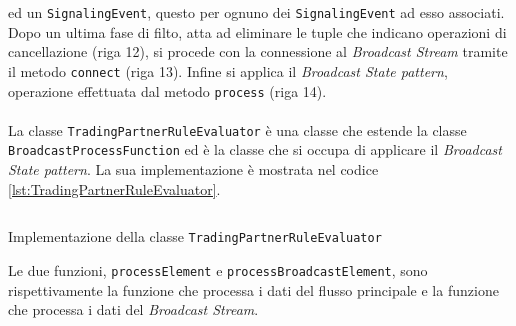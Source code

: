 ed un \texttt{SignalingEvent}, questo per ognuno dei \texttt{SignalingEvent} ad esso associati.
Dopo un ultima fase di filto, atta ad eliminare le tuple che indicano operazioni di cancellazione (riga 12), si procede con la connessione al \textit{Broadcast Stream}
tramite il metodo \texttt{connect} (riga 13).
Infine si applica il \textit{Broadcast State pattern}, operazione effettuata dal metodo \texttt{process} (riga 14).\\\\
La classe \texttt{TradingPartnerRuleEvaluator} è una classe che estende la classe \texttt{BroadcastProcessFunction} ed è la classe che si occupa di applicare il \textit{Broadcast State pattern}.
La sua implementazione è mostrata nel codice \ref{lst:TradingPartnerRuleEvaluator}.
\begin{code}
    \inputminted[linenos,fontsize=\footnotesize]{java}{listings/EventsExport/TradingPartnerRuleEvaluator.java}
    \caption{Implementazione della classe \texttt{TradingPartnerRuleEvaluator}}
    \label{lst:TradingPartnerRuleEvaluator}
\end{code}
Le due funzioni, \texttt{processElement} e \texttt{processBroadcastElement}, sono rispettivamente la funzione che processa i dati del flusso principale e la funzione che processa i dati del \textit{Broadcast Stream}.
